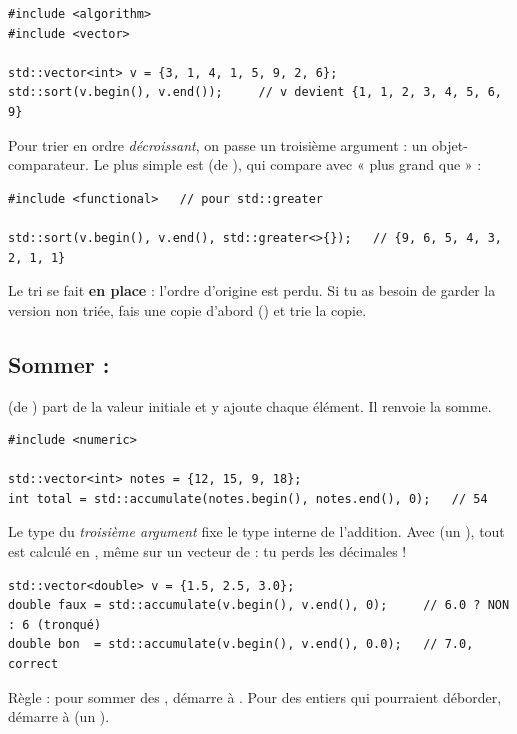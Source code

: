 \documentclass[11pt]{article}
\begin{document}
\begin{lstlisting}
#include <algorithm>
#include <vector>

std::vector<int> v = {3, 1, 4, 1, 5, 9, 2, 6};
std::sort(v.begin(), v.end());     // v devient {1, 1, 2, 3, 4, 5, 6, 9}
\end{lstlisting}

Pour trier en ordre \emph{décroissant}, on passe un troisième argument : un
objet-comparateur. Le plus simple est  (de
), qui compare avec « plus grand que » :

\begin{lstlisting}
#include <functional>   // pour std::greater

std::sort(v.begin(), v.end(), std::greater<>{});   // {9, 6, 5, 4, 3, 2, 1, 1}
\end{lstlisting}

\begin{piege}
Le tri se fait \textbf{en place} : l'ordre d'origine est perdu. Si tu as besoin
de garder la version non triée, fais une copie d'abord
() et trie la copie.
\end{piege}

\subsection*{Sommer : }

 (de ) part
de la valeur initiale et y ajoute chaque élément. Il renvoie la somme.

\begin{lstlisting}
#include <numeric>

std::vector<int> notes = {12, 15, 9, 18};
int total = std::accumulate(notes.begin(), notes.end(), 0);   // 54
\end{lstlisting}

\begin{piege}
Le type du \emph{troisième argument} fixe le type interne de l'addition. Avec
 (un ), tout est calculé en , même sur un vecteur de
 : tu perds les décimales !

\begin{lstlisting}
std::vector<double> v = {1.5, 2.5, 3.0};
double faux = std::accumulate(v.begin(), v.end(), 0);     // 6.0 ? NON : 6 (tronqué)
double bon  = std::accumulate(v.begin(), v.end(), 0.0);   // 7.0, correct
\end{lstlisting}

\noindent Règle : pour sommer des , démarre à . Pour des
entiers qui pourraient déborder, démarre à  (un ).
\end{piege}
\end{document}
